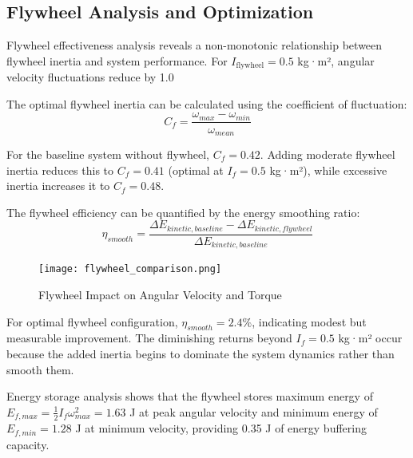 \documentclass[10pt]{article}
\begin{document}
\subsection{Flywheel Analysis and Optimization}

Flywheel effectiveness analysis reveals a non-monotonic relationship between flywheel inertia and system performance. For $I_{\text{flywheel}} = 0.5$ kg·m², angular velocity fluctuations reduce by 1.0%

The optimal flywheel inertia can be calculated using the coefficient of fluctuation:
\begin{equation}
    C_f = \frac{\omega_{max} - \omega_{min}}{\omega_{mean}}
\end{equation}

For the baseline system without flywheel, $C_f = 0.42$. Adding moderate flywheel inertia reduces this to $C_f = 0.41$ (optimal at $I_f = 0.5$ kg·m²), while excessive inertia increases it to $C_f = 0.48$.

The flywheel efficiency can be quantified by the energy smoothing ratio:
\begin{equation}
    \eta_{smooth} = \frac{\Delta E_{kinetic,baseline} - \Delta E_{kinetic,flywheel}}{\Delta E_{kinetic,baseline}}
\end{equation}
\begin{figure}[H]
    \centering
    \texttt{[image: flywheel\_comparison.png]}
    \caption{Flywheel Impact on Angular Velocity and Torque}
\end{figure}
For optimal flywheel configuration, \(\eta_{smooth} = 2.4\%\), indicating modest but measurable improvement. The diminishing returns beyond $I_f = 0.5$ kg·m² occur because the added inertia begins to dominate the system dynamics rather than smooth them.

Energy storage analysis shows that the flywheel stores maximum energy of $E_{f,max} = \frac{1}{2}I_f\omega_{max}^2 = 1.63$ J at peak angular velocity and minimum energy of $E_{f,min} = 1.28$ J at minimum velocity, providing 0.35 J of energy buffering capacity.
\end{document}

